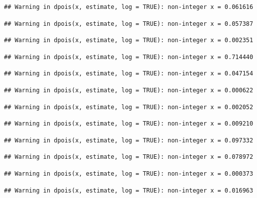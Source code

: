 \documentclass[]{article}
\begin{document}
\begin{verbatim}
## Warning in dpois(x, estimate, log = TRUE): non-integer x = 0.061616
\end{verbatim}

\begin{verbatim}
## Warning in dpois(x, estimate, log = TRUE): non-integer x = 0.057387
\end{verbatim}

\begin{verbatim}
## Warning in dpois(x, estimate, log = TRUE): non-integer x = 0.002351
\end{verbatim}

\begin{verbatim}
## Warning in dpois(x, estimate, log = TRUE): non-integer x = 0.714440
\end{verbatim}

\begin{verbatim}
## Warning in dpois(x, estimate, log = TRUE): non-integer x = 0.047154
\end{verbatim}

\begin{verbatim}
## Warning in dpois(x, estimate, log = TRUE): non-integer x = 0.000622
\end{verbatim}

\begin{verbatim}
## Warning in dpois(x, estimate, log = TRUE): non-integer x = 0.002052
\end{verbatim}

\begin{verbatim}
## Warning in dpois(x, estimate, log = TRUE): non-integer x = 0.009210
\end{verbatim}

\begin{verbatim}
## Warning in dpois(x, estimate, log = TRUE): non-integer x = 0.097332
\end{verbatim}

\begin{verbatim}
## Warning in dpois(x, estimate, log = TRUE): non-integer x = 0.078972
\end{verbatim}

\begin{verbatim}
## Warning in dpois(x, estimate, log = TRUE): non-integer x = 0.000373
\end{verbatim}

\begin{verbatim}
## Warning in dpois(x, estimate, log = TRUE): non-integer x = 0.016963
\end{verbatim}
\end{document}
